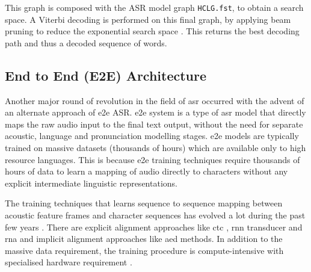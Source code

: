 


This graph is composed with the ASR model graph \texttt{HCLG.fst}, to obtain a search space. A Viterbi decoding is performed on this final graph, by applying beam pruning to reduce the exponential search space \cite{benesty2008springer,jurafsky2014speech}. This returns the best decoding path and thus a decoded sequence of words.

\subsection{End to End (E2E) Architecture}
\label{sec:Literature-e2e}

Another major round of revolution in the field of \gls{asr} occurred with the advent of an
alternate approach of \acrfull{e2e} ASR. \Gls{e2e} system is a type of \gls{asr} model that
directly maps the raw audio input to the final text output, without the need
for separate acoustic, language and pronunciation modelling stages. \Gls{e2e}
models are typically trained on massive datasets (thousands of hours) which are available only to
high resource languages. This is because \gls{e2e} training techniques require thousands of hours of data to learn a
mapping of audio directly to characters without any explicit intermediate linguistic
representations. 


The training techniques that learns sequence to sequence mapping between acoustic feature frames and character sequences has evolved a lot during the past few years \cite{prabhavalkar2023end}. There are explicit alignment approaches like \gls{ctc}  \cite{graves2006connectionist}, \gls{rnn} \cite{graves2012sequence} transducer and \gls{rna} \cite{sak2017recurrent} and implicit alignment approaches like \gls{aed} methods. In addition to the massive data requirement, the training procedure is compute-intensive with specialised hardware requirement \cite{anoop2023exploring}. 

